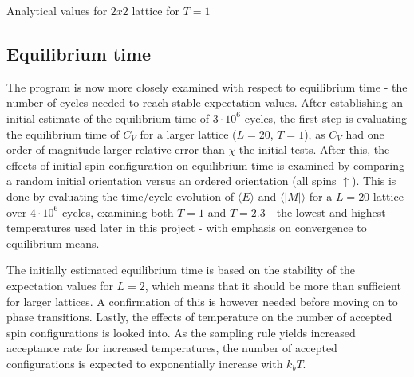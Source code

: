\documentclass[%
oneside,                 %
final,                   %
10pt]{article}
\begin{document}
\begin{table}[h!tb]
    \centering
    \caption{Analytical values for $2x2$ lattice for $T=1$}
\label{tab:analytical_values}
\end{table}
 
\subsection{Equilibrium time}
\label{SS:M.Eq.time}
The program is now more closely examined with respect to equilibrium time - the number of cycles needed to reach stable expectation values. After  \hyperref[SS:Disucssion_init_eval]{establishing an initial estimate} of the equilibrium time of $3\cdot 10^6$ cycles, the first step is evaluating the equilibrium time of $C_V$ for a larger lattice ($L=20$, $T=1$), as $C_V$ had one order of magnitude larger relative error than $\chi$ the initial tests. After this, the effects of initial spin configuration on equilibrium time is examined by comparing a random initial orientation versus an ordered orientation (all spins $\uparrow$). This is done by evaluating the time/cycle evolution of $\langle E \rangle$ and $\langle |M| \rangle$ for a $L=20$ lattice over $4 \cdot 10^6$ cycles, examining both $T=1$ and $T=2.3$ - the lowest and highest temperatures used later in this project - with emphasis on convergence to equilibrium means.  \newline

The initially estimated equilibrium time is based on the stability of the expectation values for $L=2$, which means that it should be more than sufficient for larger lattices. A confirmation of this is however needed before moving on to phase transitions. Lastly, the effects of temperature on the number of accepted spin configurations is looked into. As the sampling rule yields increased acceptance rate for increased temperatures, the number of accepted configurations is expected to exponentially increase with $k_b T$. 
\end{document}
